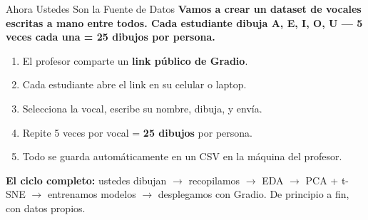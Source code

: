 \documentclass[aspectratio=169, 11pt]{beamer}
\begin{document}
\begin{frame}{Ahora Ustedes Son la Fuente de Datos}
  \vspace{-4pt}
  {\footnotesize\color{arcaDark}\bfseries
    Vamos a crear un dataset de \textbf{vocales escritas a mano}
    entre todos. Cada estudiante dibuja A, E, I, O, U --- 5 veces
    cada una = 25 dibujos por persona.}

  \vspace{6pt}
  {\footnotesize
  \begin{enumerate}\setlength{\itemsep}{4pt}
    \item[{\color{arcaRed}\bfseries 1.}]
      El profesor comparte un \textbf{link p\'ublico de Gradio}.
    \item[{\color{arcaRed}\bfseries 2.}]
      Cada estudiante abre el link en su celular o laptop.
    \item[{\color{arcaRed}\bfseries 3.}]
      Selecciona la vocal, escribe su nombre, dibuja, y env\'ia.
    \item[{\color{arcaRed}\bfseries 4.}]
      Repite 5 veces por vocal = \textbf{25 dibujos} por persona.
    \item[{\color{codeGreen}\bfseries 5.}]
      Todo se guarda autom\'aticamente en un CSV en la m\'aquina
      del profesor.
  \end{enumerate}
  }

  \vspace{4pt}
  \begin{tcolorbox}[colback=codeGreen!8, colframe=codeGreen, boxrule=0.5pt, arc=2pt,
    left=6pt, right=6pt, top=4pt, bottom=4pt]
    {\scriptsize\color{arcaDark}
    \faLightbulb\hspace{4pt}\textbf{El ciclo completo:} ustedes dibujan
    $\to$ recopilamos $\to$ EDA $\to$ PCA + t-SNE $\to$ entrenamos modelos
    $\to$ desplegamos con Gradio. De principio a fin, con datos propios.}
  \end{tcolorbox}
\end{frame}
\end{document}
